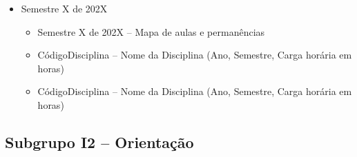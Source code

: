\begin{itemize}
    \item Semestre X de 202X
    \begin{itemize}
        \item Semestre X de 202X -- Mapa de aulas e permanências

        \item CódigoDisciplina -- Nome da Disciplina (Ano, Semestre, Carga horária em horas)

        \item CódigoDisciplina -- Nome da Disciplina (Ano, Semestre, Carga horária em horas)
    \end{itemize}
\end{itemize}


\subsection{Subgrupo I2 -- Orientação}

